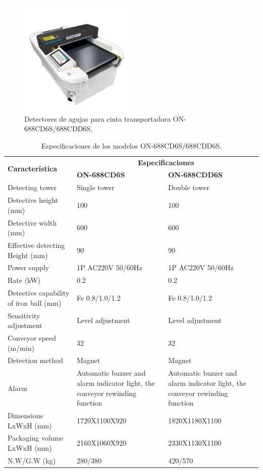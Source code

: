 \begin{figure}[h]
	\centering
	\includegraphics[width=0.5\textwidth]{img/oshima_conveyor.png}
	\caption{Detectores de agujas para cinta transportadora ON-688CD6S/688CDD6S.}
	\label{fig:oshima_conveyor}
\end{figure}

\begin{table}[H]
	\caption{Especificaciones de los modelos ON-688CD6S/688CDD6S.}
	\begin{tabularx}{\textwidth}{|X|X|X|}
		\hline
		\multirow{2}{*}[2pt]{\textbf{Característica}} & \multicolumn{2}{c|}{\textbf{Especificaciones}} \\ \cline{2-3}
		& \textbf{ON-688CD6S} & \textbf{ON-688CDD6S} \\
		\hline
		Detecting tower & Single tower & Double tower \\
		\hline
		Detective height (mm) & 100 & 100 \\
		\hline
		Detective width (mm) & 600 & 600 \\
		\hline
		Effective detecting Height (mm) & 90 & 90 \\
		\hline
		Power supply & 1P AC220V 50/60Hz & 1P AC220V 50/60Hz \\
		\hline
		Rate (kW) & 0.2 & 0.2 \\
		\hline
		Detective capability of iron ball (mm) & Fe 0.8/1.0/1.2 & Fe 0.8/1.0/1.2 \\
		\hline
		Sensitivity adjustment & Level adjustment & Level adjustment \\
		\hline
		Conveyor speed (m/min) & 32 & 32 \\
		\hline
		Detection method & Magnet & Magnet \\
		\hline
		Alarm & Automatic buzzer and alarm indicator light, the conveyor rewinding function & Automatic buzzer and alarm indicator light, the conveyor rewinding function \\
		\hline
		Dimensions LxWxH (mm) & 1720X1100X920 & 1820X1180X1100 \\
		\hline
		Packaging volume LxWxH (mm) & 2160X1060X920 & 2330X1130X1100 \\
		\hline
		N.W/G.W (kg) & 280/380 & 420/570 \\
		\hline
	\end{tabularx}
	\label{tab:specs_ON-688CD6S/688CDD6S}
\end{table}

